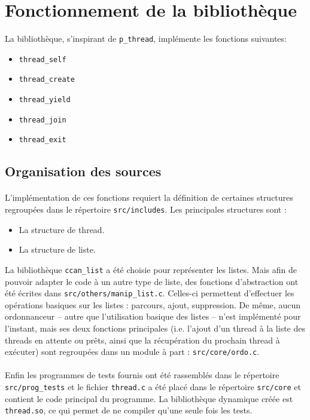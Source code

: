\section{Fonctionnement de la bibliothèque}
La bibliothèque, s'inspirant de \texttt{p\_thread}, implémente les fonctions suivantes:
\begin{itemize}
  \item \texttt{thread\_self}
  \item \texttt{thread\_create}
  \item \texttt{thread\_yield}
  \item \texttt{thread\_join}
  \item \texttt{thread\_exit}
\end{itemize}

\subsection{Organisation des sources}
\paragraph{}
L'implémentation de ces fonctions requiert la définition de certaines structures regroupées dans le répertoire \texttt{src/includes}. Les principales structures sont :
\begin{itemize}
\item La structure de thread.
\item La structure de liste.
\end{itemize}
La bibliothèque \texttt{ccan\_list} a été choisie pour représenter les listes. Mais afin de pouvoir adapter le code à un autre type de liste, des fonctions d'abstraction ont été écrites dans \texttt{src/others/manip\_list.c}. Celles-ci permettent d'effectuer les opérations basiques sur les listes : parcours, ajout, suppression. De même, aucun ordonnanceur -- autre que l'utilisation basique des listes -- n'est implémenté pour l'instant, mais ses deux fonctions principales (i.e. l'ajout d'un thread à la liste des threads en attente ou prêts, ainsi que la récupération du prochain thread à exécuter) sont regroupées dans un module à part : \texttt{src/core/ordo.c}.
\paragraph{}
Enfin les programmes de tests fournis ont été rassemblés dans le répertoire \texttt{src/prog\_tests} et le fichier \texttt{thread.c} a été placé dans le répertoire \texttt{src/core} et contient le code principal du programme. La bibliothèque dynamique créée est \texttt{thread.so}, ce qui permet de ne compiler qu'une seule fois les tests.


